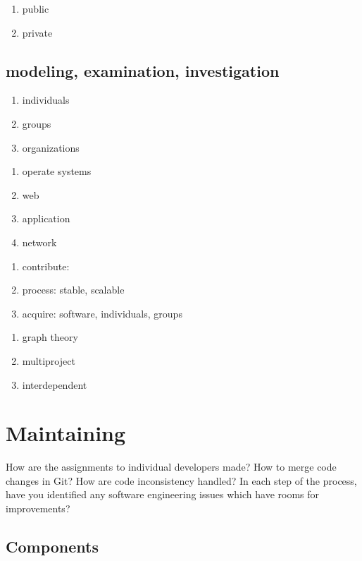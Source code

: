 \documentclass[draftclsnofoot,journal,onecolumn,12pt]{IEEEtran}
\begin{document}
\begin{enumerate}
  \item public
  \item private
\end{enumerate}

\subsection{modeling, examination, investigation}

\begin{enumerate}
  \item individuals
  \item groups
  \item organizations
\end{enumerate}

\begin{enumerate}
  \item operate systems
  \item web
  \item application
  \item network
\end{enumerate}

\begin{enumerate}
  \item contribute:
  \item process: stable, scalable
  \item acquire: software, individuals, groups
\end{enumerate}

\begin{enumerate}
  \item graph theory
  \item multiproject
  \item interdependent
\end{enumerate}

\section{Maintaining}

How are the assignments to individual developers made? How to merge code changes in Git? How are code inconsistency handled? In each step of the process, have you identified any software engineering issues which have rooms for improvements?

\subsection{Components}
\end{document}
